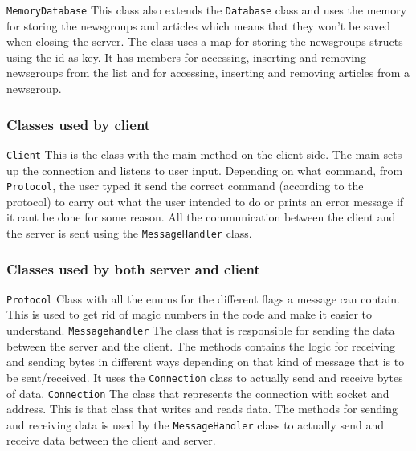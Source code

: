 \documentclass[a4paper]{article}
\def\code#1{\texttt{#1}}
\begin{document}
\newline \newline
\code{MemoryDatabase}\newline
This class also extends the \code{Database} class and uses the memory for storing the newsgroups and articles which means that they won't be saved when closing the server. The class uses a map for storing the newsgroups structs using the id as key. It has members for accessing, inserting and removing newsgroups from the list and for accessing, inserting and removing articles from a newsgroup.
\subsubsection{Classes used by client}

\code{Client}\newline
This is the class with the main method on the client side. The main sets up the connection and listens to user input. Depending on what command, from \code{Protocol}, the user typed it send the correct command (according to the protocol) to carry out what the user intended to do or prints an error message if it cant be done for some reason.
All the communication between the client and the server is sent using the \code{MessageHandler} class.
 
\subsubsection{Classes used by both server and client}
\code{Protocol}\newline
Class with all the enums for the different flags a message can contain. This is used to get rid of magic numbers in the code and make it easier to understand.
\newline \newline
\code{Messagehandler}\newline
The class that is responsible for sending the data between the server and the client. The methods contains the logic for receiving and sending bytes in different ways depending on that kind of message that is to be sent/received. It uses the \code{Connection} class to actually send and receive bytes of data.
\newline \newline
\code{Connection}\newline
The class that represents the connection with socket and address. This is that class that writes and reads data. The methods for sending and receiving data is used by the \code{MessageHandler} class to actually send and receive data between the client and server.
\end{document}
